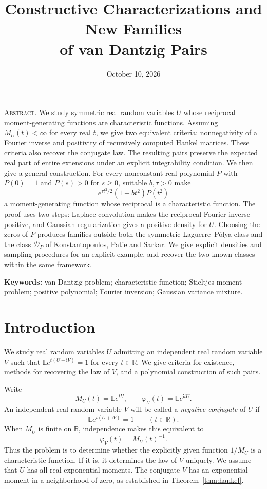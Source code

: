 \documentclass[11pt,twoside]{article}
\title{Constructive Characterizations and New Families\\of van Dantzig Pairs}
\author{}
\date{October 10, 2026}
\makeatletter
\renewcommand{\maketitle}{\thispagestyle{plain}%
  \begin{center}
  \vspace*{4mm}
  {\fontsize{18}{23}\selectfont\scshape\@title\par}
  \vspace{12pt}
  {\small\@date\par}
  \end{center}\vspace{10pt}}
\renewenvironment{abstract}{\begin{list}{}{\setlength{\leftmargin}{6mm}\setlength{\rightmargin}{6mm}}\item\relax\small\noindent\textsc{Abstract.}\enspace}{\end{list}\vspace{6pt}}
\theoremstyle{journalplain}
\numberwithin{equation}{section}
\theoremstyle{journaldefinition}
\newcommand{\R}{\mathbb R}
\newcommand{\E}{\mathbb E}
\newcommand{\DP}{\mathcal D_P}
\newcommand{\ii}{\mathrm i}
\makeatother
\begin{document}
\maketitle
\begin{abstract}
We study symmetric real random variables $U$ whose reciprocal moment-generating functions are characteristic functions. Assuming $M_U(t)<\infty$ for every real $t$, we give two equivalent criteria: nonnegativity of a Fourier inverse and positivity of recursively computed Hankel matrices. These criteria also recover the conjugate law. The resulting pairs preserve the expected real part of entire extensions under an explicit integrability condition. We then give a general construction. For every nonconstant real polynomial $P$ with $P(0)=1$ and $P(s)>0$ for $s\ge0$, suitable $b,\tau>0$ make
\[
 e^{\tau t^2/2}(1+bt^2)P(t^2)
\]
a moment-generating function whose reciprocal is a characteristic function. The proof uses two steps: Laplace convolution makes the reciprocal Fourier inverse positive, and Gaussian regularization gives a positive density for $U$. Choosing the zeros of $P$ produces families outside both the symmetric Laguerre--P\'olya class and the class $\DP$ of Konstantopoulos, Patie and Sarkar. We give explicit densities and sampling procedures for an explicit example, and recover the two known classes within the same framework.
\end{abstract}
\noindent\textbf{Keywords:} van Dantzig problem; characteristic function; Stieltjes moment problem; positive polynomial; Fourier inversion; Gaussian variance mixture.

\section{Introduction}\label{sec:intro}
We study real random variables $U$ admitting an independent real random variable $V$ such that $\E e^{t(U+\ii V)}=1$ for every $t\in\R$. We give criteria for existence, methods for recovering the law of $V$, and a polynomial construction of such pairs.

Write
\[
 M_U(t)=\E e^{tU},\qquad \varphi_U(t)=\E e^{\ii tU}.
\]
An independent real random variable $V$ will be called a \emph{negative conjugate} of $U$ if
\begin{equation}\label{eq:cancel}
 \E e^{t(U+\ii V)}=1\qquad(t\in\R).
\end{equation}
When $M_U$ is finite on $\R$, independence makes this equivalent to
\begin{equation}\label{eq:reciprocal}
 \varphi_V(t)=M_U(t)^{-1}.
\end{equation}
Thus the problem is to determine whether the explicitly given function $1/M_U$ is a characteristic function. If it is, it determines the law of $V$ uniquely. We assume that $U$ has all real exponential moments. The conjugate $V$ has an exponential moment in a neighborhood of zero, as established in Theorem~\ref{thm:hankel}.
\end{document}

